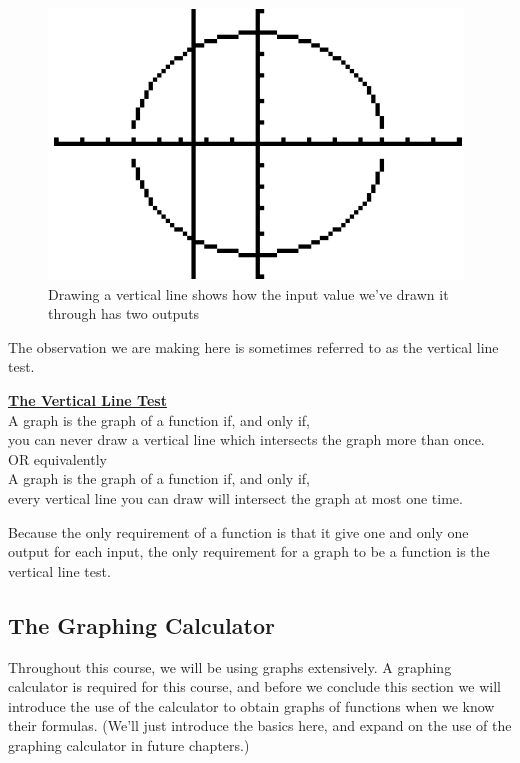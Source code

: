 \begin{figure}[H]
	\centering
	\includegraphics[scale=1.0]{Sections/FunctionsandGraphsImages/Figure18.png}
	\caption{Drawing a vertical line shows how the input value we've drawn it through has two outputs}
\end{figure}

The observation we are making here is sometimes referred to as the vertical line test.

\begin{definition}
	\textbf{\underline{The Vertical Line Test}}\\
	\bigskip
	A graph is the graph of a function if, and only if,\\ you can never draw a vertical line which intersects the graph more than once.\\
	\bigskip
	OR equivalently\\
	\bigskip
	A graph is the graph of a function if, and only if, \\ every vertical line you can draw will intersect the graph at most one time.
\end{definition}

Because the only requirement of a function is that it give one and only one output for each input, the only requirement for a graph to be a function is the vertical line test.

%
%

\subsection{The Graphing Calculator}

Throughout this course, we will be using graphs extensively. A graphing calculator is required for this course, and before we conclude this section we will introduce the use of the calculator to obtain graphs of functions when we know their formulas. (We’ll just introduce the basics here, and expand on the use of the graphing calculator in future chapters.)\\

